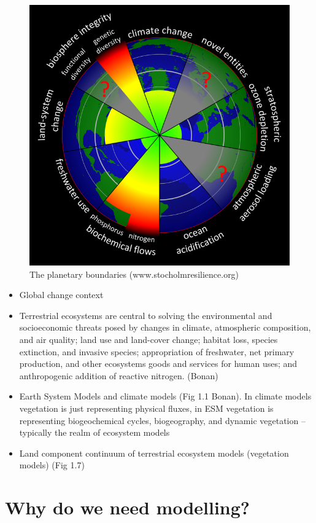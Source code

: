 \documentclass[
  oneside]{book}
\providecommand{\tightlist}{%
  \setlength{\itemsep}{0pt}\setlength{\parskip}{0pt}}
\begin{document}
\begin{figure}

{\centering \includegraphics[width=0.8\linewidth]{figures/planetary_boundaries} 

}

\caption{The planetary boundaries (www.stocholmresilience.org)}\label{fig:f1}
\end{figure}

\begin{itemize}
\tightlist
\item
  Global change context
\item
  Terrestrial ecosystems are central to solving the environmental and socioeconomic threats posed by changes in climate, atmospheric composition, and air quality; land use and land-cover change; habitat loss, species extinction, and invasive species; appropriation of freshwater, net primary production, and other ecosystems goods and services for human uses; and anthropogenic addition of reactive nitrogen. (Bonan)
\item
  Earth System Models and climate models (Fig 1.1 Bonan). In climate models vegetation is just representing physical fluxes, in ESM vegetation is representing biogeochemical cycles, biogeography, and dynamic vegetation -- typically the realm of ecosystem models
\item
  Land component continuum of terrestrial ecosystem models (vegetation models) (Fig 1.7)
\end{itemize}

\hypertarget{why-do-we-need-modelling}{%
\section{Why do we need modelling?}\label{why-do-we-need-modelling}}
\end{document}
